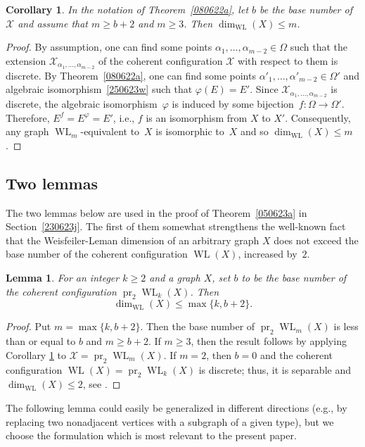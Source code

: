 \documentclass{amsart}
\newcommand{\cal}{\mathcal}
\newtheorem{corollary}[formula]{Corollary}
\newtheorem{lemma}[formula]{Lemma}
\def\lmml#1{\begin{lemma}\label{#1}}
\def\elmm{\end{lemma}}
\def\prf{\begin{proof}}
\def\eprf{\end{proof}}
\def\cX{{\cal X}}
\DeclareMathOperator{\pr}{pr}
\DeclareMathOperator{\WL}{WL}
\begin{document}
\begin{corollary}\label{coro1}
In the notation of Theorem~\ref{080622a}, 
let $b$ be the base number of $\cX$ and assume that 
$m\geq b+2$ and $m\geq 3$. 
Then $\dim_{\scriptscriptstyle\WL}(X)\le m$.
\end{corollary}
\prf
By assumption, 
one can find some points $\alpha_1,\ldots,\alpha_{m-2}\in\Omega$ 
such that the extension $\cX_{\alpha_1,\ldots,\alpha_{m-2}}$ of 
the coherent configuration $\cX$ with respect to them is discrete. 
By Theorem~\ref{080622a}, one can 
find some points $\alpha'_1,\ldots,\alpha'_{m-2}\in\Omega'$ and algebraic isomorphism~\eqref{250623w} such that $\varphi(E)=E'$. 
Since $\cX_{\alpha_1,\ldots,\alpha_{m-2}}$ is discrete, 
the algebraic isomorphism~$\varphi$ is induced by some  bijection~$f\colon\Omega\to\Omega'$. Therefore, $E^f=E^\varphi=E'$, i.e., $f$ is an isomorphism from $X$ to $X'$. Consequently, any graph $\WL_m$-equivalent to~$X$ is isomorphic to~$X$ and so   $\dim_{\scriptscriptstyle\WL}(X)\le m$.
\eprf

\subsection{Two lemmas}
The two lemmas below are used in the proof of Theorem~\ref{050623a} in Section~\ref{230623j}. The first of them somewhat strengthens the well-known fact that the Weisfeiler-Leman dimension of an arbitrary graph $X$ does not exceed the base number of the coherent configuration $\WL(X)$, increased by~$2$.

\lmml{090623a}
For an integer $k\ge 2$ and a graph $X$, set $b$ to be 
the base number of the coherent configuration $\pr_2 \WL_{k}(X)$. 
Then
$$
\dim_{\scriptscriptstyle\WL}(X)\le\max\{k,b+2\}.
$$
\elmm
\prf
Put $m=\max\{k,b+2\}$. Then the base number of 
$\pr_2\WL_{m}(X)$ is less than or equal to $b$ and 
$m\geq b+2$. 
If $m\geq 3$, then the result follows by 
applying Corollary \ref{coro1} to $\cX=\pr_2\WL_{m}(X)$.
If $m=2$, then $b=0$ and the coherent configuration 
$\WL(X)=\pr_2 \WL_k(X)$ is discrete; thus, it is separable 
and $\dim_{\scriptscriptstyle\WL}(X)\le 2$, see \cite[Theorem~2.5]{Fuhlbr2018a}. 
\eprf 

The following lemma could  easily be generalized in different directions (e.g., by replacing two nonadjacent vertices with 
a subgraph of a given type), but we choose the formulation which 
is most relevant to the present paper.
\end{document}
